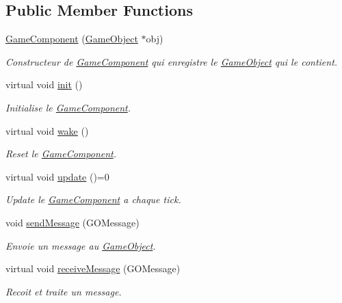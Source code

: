 \subsection*{Public Member Functions}
\begin{DoxyCompactItemize}
\item 
\hyperlink{class_game_component_a7d6d7a04c69a2eb0aa2d367925b501a2}{Game\+Component} (\hyperlink{class_game_object}{Game\+Object} $\ast$obj)
\begin{DoxyCompactList}\small\item\em Constructeur de \hyperlink{class_game_component}{Game\+Component} qui enregistre le \hyperlink{class_game_object}{Game\+Object} qui le contient. \end{DoxyCompactList}\item 
\hypertarget{class_game_component_ae602abc2eed3c565f410548aad7ee14e}{}\label{class_game_component_ae602abc2eed3c565f410548aad7ee14e} 
virtual void \hyperlink{class_game_component_ae602abc2eed3c565f410548aad7ee14e}{init} ()
\begin{DoxyCompactList}\small\item\em Initialise le \hyperlink{class_game_component}{Game\+Component}. \end{DoxyCompactList}\item 
\hypertarget{class_game_component_a3334ffc79f717357970abfbdb7eb4024}{}\label{class_game_component_a3334ffc79f717357970abfbdb7eb4024} 
virtual void \hyperlink{class_game_component_a3334ffc79f717357970abfbdb7eb4024}{wake} ()
\begin{DoxyCompactList}\small\item\em Reset le \hyperlink{class_game_component}{Game\+Component}. \end{DoxyCompactList}\item 
\hypertarget{class_game_component_a65fc004cd4dc7593052327ff874bb2f0}{}\label{class_game_component_a65fc004cd4dc7593052327ff874bb2f0} 
virtual void \hyperlink{class_game_component_a65fc004cd4dc7593052327ff874bb2f0}{update} ()=0
\begin{DoxyCompactList}\small\item\em Update le \hyperlink{class_game_component}{Game\+Component} a chaque tick. \end{DoxyCompactList}\item 
\hypertarget{class_game_component_a30bad20d9395895883bb75b998e9c974}{}\label{class_game_component_a30bad20d9395895883bb75b998e9c974} 
void \hyperlink{class_game_component_a30bad20d9395895883bb75b998e9c974}{send\+Message} (G\+O\+Message)
\begin{DoxyCompactList}\small\item\em Envoie un message au \hyperlink{class_game_object}{Game\+Object}. \end{DoxyCompactList}\item 
virtual void \hyperlink{class_game_component_a449c4a683e9bb42e0ab939a06e7b0640}{receive\+Message} (G\+O\+Message)
\begin{DoxyCompactList}\small\item\em Recoit et traite un message. \end{DoxyCompactList}\end{DoxyCompactItemize}
